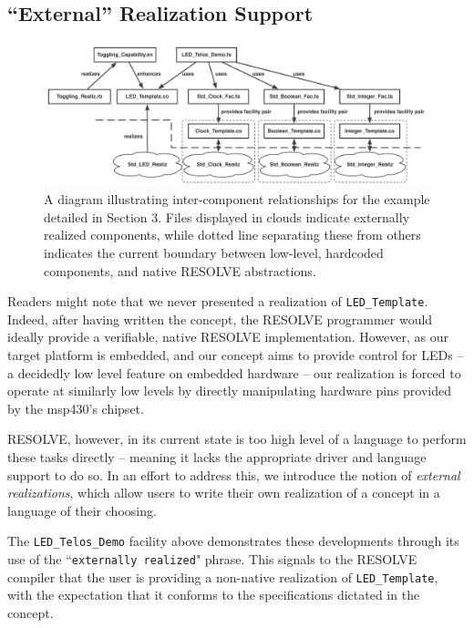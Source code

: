 \subsection{``External'' Realization Support}
\label{ssec:external}

\begin{figure}[!htb]
\centering
\includegraphics[scale=.55]{figs/component_graph.pdf}
\caption{A diagram illustrating inter-component relationships for the example detailed in Section 3. Files displayed in clouds indicate externally realized components, while dotted line separating these from others indicates the current boundary between low-level, hardcoded components, and native RESOLVE abstractions.}
\end{figure}
\label{fig:imp}


Readers might note that we never presented a realization of \texttt{LED\_Template}. Indeed, after having written the concept, the RESOLVE programmer would ideally provide a verifiable, native RESOLVE implementation. However, as our target platform is embedded, and our concept aims to provide control for LEDs -- a decidedly low level feature on embedded hardware -- our realization is forced to operate at similarly low levels by directly manipulating hardware pins provided by the msp430's chipset. 

RESOLVE, however, in its current state is too high level of a language to perform these tasks directly -- meaning it lacks the appropriate driver and language support to do so. In an effort to address this, we introduce the notion of \textit{external realizations}, which allow users to write their own realization of a concept in a language of their choosing.

The \texttt{LED\_Telos\_Demo} facility above demonstrates these developments through its use of the ``\texttt{externally realized}" phrase. This signals to the RESOLVE compiler that the user is providing a non-native realization of \texttt{LED\_Template}, with the expectation that it conforms to the specifications dictated in the concept. 

